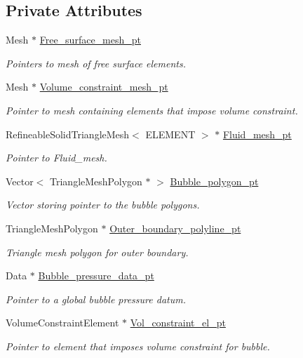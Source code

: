 \subsection*{Private Attributes}
\begin{DoxyCompactItemize}
\item 
Mesh $\ast$ \hyperlink{classBubbleInChannelProblem_a453d5544b8e936594c1c7f8587e85da2}{Free\+\_\+surface\+\_\+mesh\+\_\+pt}
\begin{DoxyCompactList}\small\item\em Pointers to mesh of free surface elements. \end{DoxyCompactList}\item 
Mesh $\ast$ \hyperlink{classBubbleInChannelProblem_a341644d44c22ff16c9023b614f0c6471}{Volume\+\_\+constraint\+\_\+mesh\+\_\+pt}
\begin{DoxyCompactList}\small\item\em Pointer to mesh containing elements that impose volume constraint. \end{DoxyCompactList}\item 
Refineable\+Solid\+Triangle\+Mesh$<$ E\+L\+E\+M\+E\+NT $>$ $\ast$ \hyperlink{classBubbleInChannelProblem_a1699f6dff44b3d9cb606c7227f5679b7}{Fluid\+\_\+mesh\+\_\+pt}
\begin{DoxyCompactList}\small\item\em Pointer to Fluid\+\_\+mesh. \end{DoxyCompactList}\item 
Vector$<$ Triangle\+Mesh\+Polygon $\ast$ $>$ \hyperlink{classBubbleInChannelProblem_a31c26dd6bdb8071bf80bb7c4b29930d7}{Bubble\+\_\+polygon\+\_\+pt}
\begin{DoxyCompactList}\small\item\em Vector storing pointer to the bubble polygons. \end{DoxyCompactList}\item 
Triangle\+Mesh\+Polygon $\ast$ \hyperlink{classBubbleInChannelProblem_a3a8d8a03e409ce1cfee1f7ce3e1a9434}{Outer\+\_\+boundary\+\_\+polyline\+\_\+pt}
\begin{DoxyCompactList}\small\item\em Triangle mesh polygon for outer boundary. \end{DoxyCompactList}\item 
Data $\ast$ \hyperlink{classBubbleInChannelProblem_a88f2b8e5e56219b8e557d8e78fc5b989}{Bubble\+\_\+pressure\+\_\+data\+\_\+pt}
\begin{DoxyCompactList}\small\item\em Pointer to a global bubble pressure datum. \end{DoxyCompactList}\item 
Volume\+Constraint\+Element $\ast$ \hyperlink{classBubbleInChannelProblem_ac0343258f630d7c0886cca51ba57e80d}{Vol\+\_\+constraint\+\_\+el\+\_\+pt}
\begin{DoxyCompactList}\small\item\em Pointer to element that imposes volume constraint for bubble. \end{DoxyCompactList}\end{DoxyCompactItemize}


